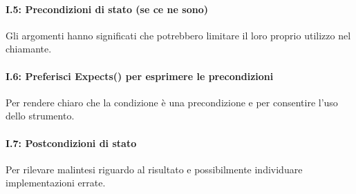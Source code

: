 \paragraph{I.5: Precondizioni di stato (se ce ne sono)}

\textsf{\small Gli argomenti hanno significati che potrebbero limitare il loro proprio utilizzo nel chiamante.} \\

\paragraph{I.6: Preferisci \textbf{Expects()} per esprimere le precondizioni}

\textsf{\small Per rendere chiaro che la condizione è una precondizione e per consentire l'uso dello strumento.} \\ %

\paragraph{I.7: Postcondizioni di stato }

\textsf{\small Per rilevare malintesi riguardo al risultato e possibilmente individuare implementazioni errate.} \\

